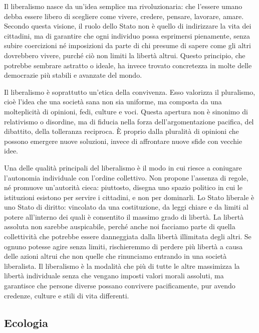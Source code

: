\documentclass[12pt]{book} %
\begin{document}
Il liberalismo nasce da un’idea semplice ma rivoluzionaria: che l’essere umano debba essere libero di scegliere come vivere, credere, pensare, lavorare, amare. Secondo questa visione, il ruolo dello Stato non è quello di indirizzare la vita dei cittadini, ma di garantire che ogni individuo possa esprimersi pienamente, senza subire coercizioni né imposizioni da parte di chi presume di sapere come gli altri dovrebbero vivere, purché ciò non limiti la libertà altrui. Questo principio, che potrebbe sembrare astratto o ideale, ha invece trovato concretezza in molte delle democrazie più stabili e avanzate del mondo.

Il liberalismo è soprattutto un’etica della convivenza. Esso valorizza il pluralismo, cioè l’idea che una società sana non sia uniforme, ma composta da una molteplicità di opinioni, fedi, culture e voci. Questa apertura non è sinonimo di relativismo o disordine, ma di fiducia nella forza dell’argomentazione pacifica, del dibattito, della tolleranza reciproca. È proprio dalla pluralità di opinioni che possono emergere nuove soluzioni, invece di affrontare nuove sfide con vecchie idee.

Una delle qualità principali del liberalismo è il modo in cui riesce a coniugare l'autonomia individuale con l'ordine collettivo. Non propone l’assenza di regole, né promuove un’autorità cieca: piuttosto, disegna uno spazio politico in cui le istituzioni esistono per servire i cittadini, e non per dominarli. Lo Stato liberale è uno Stato di diritto: vincolato da una costituzione, da leggi chiare e da limiti al potere all'interno dei quali è consentito il massimo grado di libertà. La libertà assoluta non sarebbe auspicabile, perché anche noi facciamo parte di quella collettività che potrebbe essere danneggiata dalla libertà illimitata degli altri. Se ognuno potesse agire senza limiti, rischieremmo di perdere più libertà a causa delle azioni altrui che non quelle che rinunciamo entrando in una società liberalista. Il liberalismo è la modalità che più di tutte le altre massimizza la libertà individuale senza che vengano imposti valori morali assoluti, ma garantisce che persone diverse possano convivere pacificamente, pur avendo credenze, culture e stili di vita differenti.

\clearpage\subsection{Ecologia}
\end{document}
